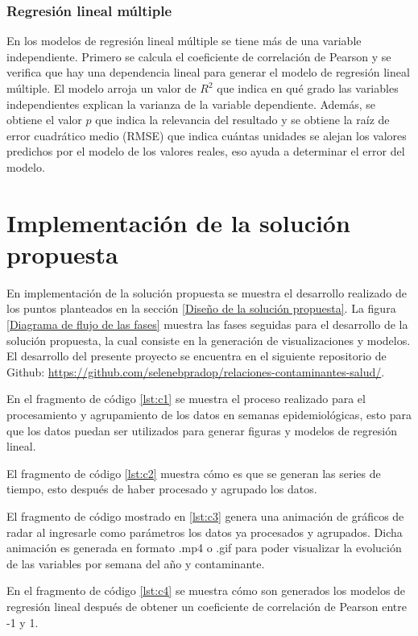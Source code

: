 \subsubsection{Regresión lineal múltiple}
En los modelos de regresión lineal múltiple se tiene más de una variable independiente. Primero se calcula el coeficiente de correlación de Pearson y se verifica que hay una dependencia lineal para generar el modelo de regresión lineal múltiple. El modelo arroja un valor de $R^2$ que indica en qué grado las variables independientes explican la varianza de la variable dependiente. Además, se obtiene el valor $p$ que indica la relevancia del resultado y se obtiene la raíz de error cuadrático medio (RMSE) que indica cuántas unidades se alejan los valores predichos por el modelo de los valores reales, eso ayuda a determinar el error del modelo.

\section{Implementación de la solución propuesta}
En implementación de la solución propuesta se muestra el desarrollo realizado de los puntos planteados en la sección \ref{Diseño de la solución propuesta}. La figura \ref{Diagrama de flujo de las fases} muestra las fases seguidas para el desarrollo de la solución propuesta, la cual consiste en la generación de visualizaciones y modelos. El desarrollo del presente proyecto se encuentra en el siguiente repositorio de Github: \url{https://github.com/selenebpradop/relaciones-contaminantes-salud/}.

En el fragmento de código \ref{lst:c1} se muestra el proceso realizado para el procesamiento y agrupamiento de los datos en semanas epidemiológicas, esto para que los datos puedan ser utilizados para generar figuras y modelos de regresión lineal.

El fragmento de código \ref{lst:c2} muestra cómo es que se generan las series de tiempo, esto después de haber procesado y agrupado los datos.

El fragmento de código mostrado en \ref{lst:c3} genera una animación de gráficos de radar al ingresarle como parámetros los datos ya procesados y agrupados. Dicha animación es generada en formato .mp4 o .gif para poder visualizar la evolución de las variables por semana del año y contaminante.

En el fragmento de código \ref{lst:c4} se muestra cómo son generados los modelos de regresión lineal después de obtener un coeficiente de correlación de Pearson entre -1 y 1.

